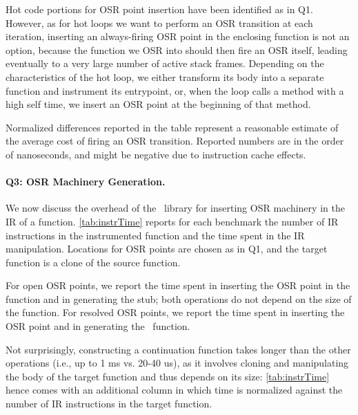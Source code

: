 \begin{description}
Hot code portions for OSR point insertion have been identified as in Q1. %
\ifdefined\fullver %
However, as for hot loops we want to perform an OSR transition at each iteration, inserting an always-firing OSR point in the enclosing function is not an option, because the function we OSR into should then fire an OSR itself, leading eventually to a very large number of active stack frames. 
\fi %
Depending on the characteristics of the hot loop, we either transform its body into a separate function and instrument its entrypoint, or, when the loop calls a method with a high self time, we insert an OSR point at the beginning of that method.

Normalized differences reported in the table represent a reasonable estimate of the average cost of firing an OSR transition.
Reported numbers are in the order of nanoseconds, and might be negative due to instruction cache effects.

\paragraph{Q3: OSR Machinery Generation.}
We now discuss the overhead of the \osrkit\ library for inserting OSR machinery in the IR of a function. \mytable\ref{tab:instrTime} reports for each benchmark the number of IR instructions in the instrumented function and the time spent in the IR manipulation. Locations for OSR points are chosen as in 
Q1, and the target function is a clone of the source function.

For open OSR points, we report the time spent in inserting the OSR point in the function and in generating the stub; both operations do not depend on the size of the function. For resolved OSR points, we report the time spent in inserting the OSR point and in generating the \fosrto\ function.

\noindent Not surprisingly, constructing a continuation function takes longer than the other operations (i.e., up to 1 ms vs. 20-40 us), as it involves cloning and manipulating the body of the target function and thus depends on its size: \mytable\ref{tab:instrTime} hence comes with an additional column in which time is normalized against the number of IR instructions in the target function.


\end{description}
